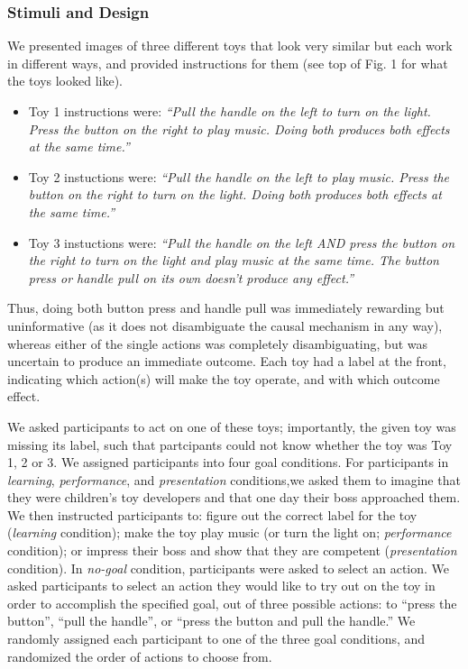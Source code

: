 \documentclass[10pt, letterpaper]{article}
\begin{document}
\subsubsection{Stimuli and Design}\label{stimuli-and-design}

We presented images of three different toys that look very similar but
each work in different ways, and provided instructions for them (see top
of Fig. 1 for what the toys looked like).

\begin{itemize}
\item
  Toy 1 instructions were: \emph{``Pull the handle on the left to turn
  on the light. Press the button on the right to play music. Doing both
  produces both effects at the same time.''}
\item
  Toy 2 instuctions were: \emph{``Pull the handle on the left to play
  music. Press the button on the right to turn on the light. Doing both
  produces both effects at the same time.''}
\item
  Toy 3 instuctions were: \emph{``Pull the handle on the left AND press
  the button on the right to turn on the light and play music at the
  same time. The button press or handle pull on its own doesn't produce
  any effect.''}
\end{itemize}

Thus, doing both button press and handle pull was immediately rewarding
but uninformative (as it does not disambiguate the causal mechanism in
any way), whereas either of the single actions was completely
disambiguating, but was uncertain to produce an immediate outcome. Each
toy had a label at the front, indicating which action(s) will make the
toy operate, and with which outcome effect.

We asked participants to act on one of these toys; importantly, the
given toy was missing its label, such that partcipants could not know
whether the toy was Toy 1, 2 or 3. We assigned participants into four
goal conditions. For participants in \emph{learning},
\emph{performance}, and \emph{presentation} conditions,we asked them to
imagine that they were children's toy developers and that one day their
boss approached them. We then instructed participants to: figure out the
correct label for the toy (\emph{learning} condition); make the toy play
music (or turn the light on; \emph{performance} condition); or impress
their boss and show that they are competent (\emph{presentation}
condition). In \emph{no-goal} condition, participants were asked to
select an action. We asked participants to select an action they would
like to try out on the toy in order to accomplish the specified goal,
out of three possible actions: to ``press the button'', ``pull the
handle'', or ``press the button and pull the handle.'' We randomly
assigned each participant to one of the three goal conditions, and
randomized the order of actions to choose from.
\end{document}
